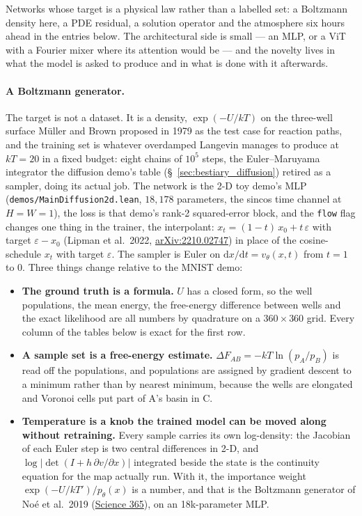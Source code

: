 Networks whose target is a physical law rather than a labelled set: a
Boltzmann density here, a PDE residual, a solution operator and the
atmosphere six hours ahead in the entries below. The architectural side is
small --- an MLP, or a ViT with a Fourier mixer where its attention would be
--- and the novelty lives in what the model is asked to produce and in what
is done with it afterwards.

\paragraph{A Boltzmann generator.} The target is not a dataset. It is a
density, $\exp(-U/kT)$ on the three-well surface M\"uller and Brown proposed
in 1979 as the test case for reaction paths, and the training set is whatever
overdamped Langevin manages to produce at $kT = 20$ in a fixed budget: eight
chains of $10^5$ steps, the Euler--Maruyama integrator the diffusion demo's
table (\S~\ref{sec:bestiary_diffusion}) retired as a sampler, doing its actual
job. The network is the 2-D toy demo's MLP
(\texttt{demos/MainDiffusion2d.lean}, $18{,}178$ parameters, the sincos time
channel at $H = W = 1$), the loss is that demo's rank-2 squared-error block,
and the \texttt{flow} flag changes one thing in the trainer, the interpolant:
$x_t = (1-t)\,x_0 + t\,\varepsilon$ with target $\varepsilon - x_0$ (Lipman et
al.\ 2022, \href{https://arxiv.org/abs/2210.02747}{arXiv:2210.02747}) in place
of the cosine-schedule $x_t$ with target $\varepsilon$. The sampler is Euler on
$\mathrm{d}x/\mathrm{d}t = v_\theta(x, t)$ from $t = 1$ to $0$. Three things
change relative to the MNIST demo:

\begin{itemize}
  \item \textbf{The ground truth is a formula.} $U$ has a closed form, so the
    well populations, the mean energy, the free-energy difference between
    wells and the exact likelihood are all numbers by quadrature on a
    $360 \times 360$ grid. Every column of the tables below is exact for the
    first row.
  \item \textbf{A sample set is a free-energy estimate.} $\Delta F_{AB} =
    -kT \ln (p_A / p_B)$ is read off the populations, and populations are
    assigned by gradient descent to a minimum rather than by nearest minimum,
    because the wells are elongated and Voronoi cells put part of A's basin
    in C.
  \item \textbf{Temperature is a knob the trained model can be moved along
    without retraining.} Every sample carries its own log-density: the
    Jacobian of each Euler step is two central differences in 2-D, and
    $\log|\det(I + h\,\partial v/\partial x)|$ integrated beside the state is
    the continuity equation for the map actually run. With it, the
    importance weight $\exp(-U/kT') / p_\theta(x)$ is a number, and that is
    the Boltzmann generator of No\'e et al.\ 2019
    (\href{https://doi.org/10.1126/science.aaw1147}{Science 365}), on an
    18k-parameter MLP.
\end{itemize}

